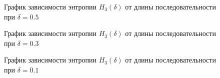 ﻿\documentclass[a4paper,12pt]{article}
\theoremstyle{plain}
\begin{document}
	\begin{figure}[h]
		\caption{График зависимости энтропии $H_3{(\delta)}$ от длины последовательности при  $\delta = 0.5$}
		\label{ris:"h3_05.png"}
	\end{figure}
	\begin{figure}[h]
		\caption{График зависимости энтропии $H_3{(\delta)}$ от длины последовательности при  $\delta = 0.3$}
		\label{ris:"h3_03.png"}
	\end{figure}
		\begin{figure}[h]
			\caption{График зависимости энтропии $H_3{(\delta)}$ от длины последовательности при  $\delta = 0.1$}
			\label{ris:"h3_01.png"}
		\end{figure}
\end{document}

